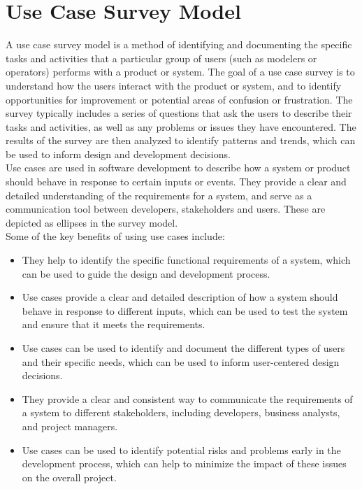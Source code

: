 \chapter{Use Case Survey Model}
A use case survey model is a method of identifying and documenting the specific tasks and activities that a particular group of users (such as modelers or operators) performs with a product or system. The goal of a use case survey is to understand how the users interact with the product or system, and to identify opportunities for improvement or potential areas of confusion or frustration. The survey typically includes a series of questions that ask the users to describe their tasks and activities, as well as any problems or issues they have encountered. The results of the survey are then analyzed to identify patterns and trends, which can be used to inform design and development decisions.\vspace{5mm} \\
Use cases are used in software development to describe how a system or product should behave in response to certain inputs or events. They provide a clear and detailed understanding of the requirements for a system, and serve as a communication tool between developers, stakeholders and users. These are depicted as ellipses in the survey model.\vspace{5mm} \\
Some of the key benefits of using use cases include:
\begin{itemize}
  \item They help to identify the specific functional requirements of a system, which can be used to guide the design and development process.
  \item Use cases provide a clear and detailed description of how a system should behave in response to different inputs, which can be used to test the system and ensure that it meets the requirements.
  \item Use cases can be used to identify and document the different types of users and their specific needs, which can be used to inform user-centered design decisions.
  \item They provide a clear and consistent way to communicate the requirements of a system to different stakeholders, including developers, business analysts, and project managers.
  \item Use cases can be used to identify potential risks and problems early in the development process, which can help to minimize the impact of these issues on the overall project.
\end{itemize}
